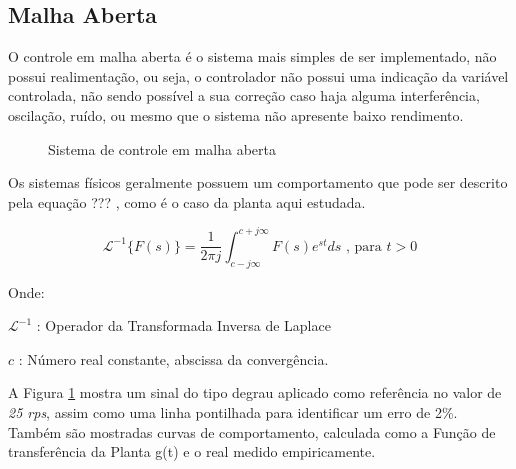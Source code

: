 \subsection{ Malha Aberta }

O controle em malha aberta é o sistema mais simples de ser implementado, não possui realimentação, ou seja, o controlador não possui uma indicação da variável controlada, não sendo possível a sua correção caso haja alguma interferência, oscilação, ruído, ou mesmo que o sistema não apresente baixo rendimento.

\begin{figure}[!htb]
\centering
{}
\caption{ Sistema de controle em malha aberta}
\label{fig:acaoMalhaAberta}
\end{figure}

Os sistemas físicos geralmente possuem um comportamento que pode ser descrito pela equação ??? , como é o caso da planta aqui estudada. 



\begin{equation}
\mathscr{L}^{-1} \{F(s)\} =  \frac{1}{2 \pi j} \int_{c-j\infty}^{c+j\infty}F(s) e^{st} ds  \text{ , para } t > 0
\label{eq:transfInvLaplace}
\end{equation}

Onde:

\setlength{\parindent}{2cm}
$\mathscr{L}^{-1}$ : Operador da Transformada Inversa de Laplace

$c$ : Número real constante, abscissa da convergência.

\setlength{\parindent}{1cm}




A Figura \ref{fig:acaoMalhaAberta} mostra um sinal do tipo degrau aplicado como referência no valor de \emph{25 rps}, assim como uma linha pontilhada para identificar um erro de 2\%. Também são mostradas curvas de comportamento, calculada como a Função de transferência da Planta g(t) e o real medido empiricamente.

